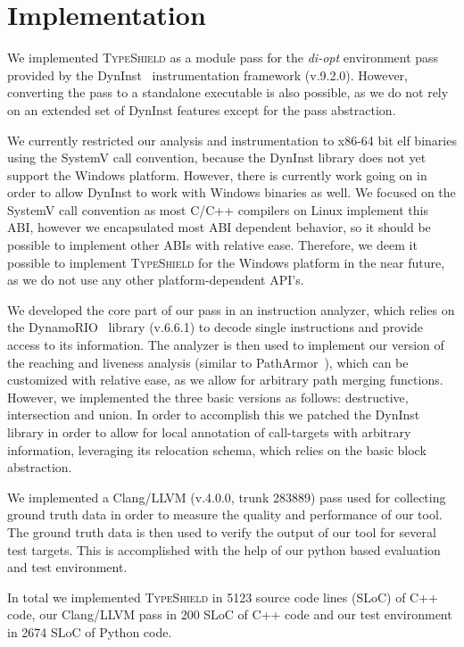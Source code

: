 \section{Implementation}
\label{chapter:Implementation}

We implemented \textsc{TypeShield} as a module pass for the \textit{di-opt} environment pass provided by the 
DynInst~\cite{bernat:dyninst} instrumentation framework (v.9.2.0). 
However, converting the pass to a standalone executable is also possible, as we do not rely on an extended set of DynInst features
except for the pass abstraction.

We currently restricted our analysis and instrumentation to x86-64 bit elf 
binaries using the SystemV call convention, because the DynInst library does not yet support the
Windows platform. However, there is currently work going on in order to allow DynInst to work with
Windows binaries as well. We focused on the SystemV call convention as most C/C++ compilers
on Linux implement this ABI, however we encapsulated most ABI dependent behavior, so it should 
be possible to implement other ABIs with relative ease. Therefore, we deem it possible to implement
\textsc{TypeShield} for the Windows platform in the near future, as we do not use any other 
platform-dependent API's. 

We developed the core part of our pass in an instruction analyzer, which relies on the DynamoRIO~\cite{dynamorio:drmemory} library 
(v.6.6.1) to decode single instructions and provide access to its information. The analyzer is then
used to implement our version of the reaching and liveness analysis (similar to PathArmor~\cite{veen:typearmor}), which can
be customized with relative ease, as we allow for arbitrary path merging functions. However, we implemented 
the three basic versions as follows: destructive, intersection and union.
In order to accomplish this we patched the DynInst library in order to allow for local annotation of call-targets with arbitrary
information, leveraging its relocation schema, which relies on the basic block abstraction.

We implemented a Clang/LLVM (v.4.0.0, trunk 283889) pass used for 
collecting ground truth data in order to measure the quality and performance of our tool. 
The ground truth data is then used to verify the output of our tool for several test targets. 
This is accomplished with the help of our python based evaluation and test environment.

In total we implemented \textsc{TypeShield} in 5123 source code lines (SLoC) of C++ code, our Clang/LLVM pass in 200 SLoC
of C++ code and our test environment in 2674 SLoC of Python code. 


